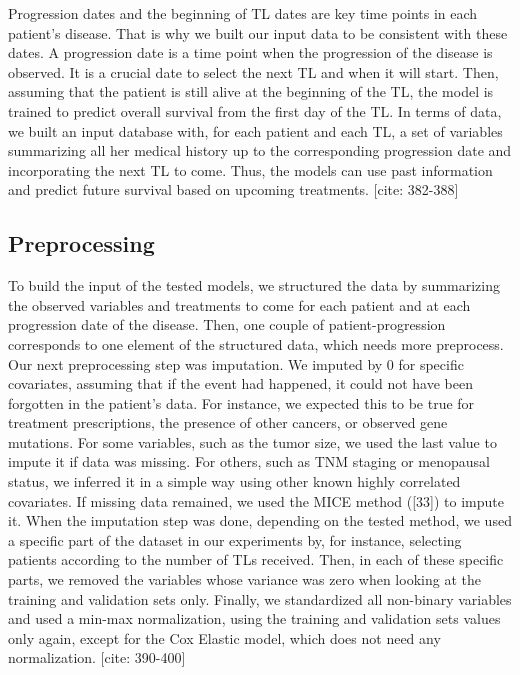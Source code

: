 \documentclass[a4paper,10pt]{article}
\begin{document}
Progression dates and the beginning of TL dates are key time points in each patient's disease. That is why we built our input data to be consistent with these dates. A progression date is a time point when the progression of the disease is observed. It is a crucial date to select the next TL and when it will start. Then, assuming that the patient is still alive at the beginning of the TL, the model is trained to predict overall survival from the first day of the TL. In terms of data, we built an input database with, for each patient and each TL, a set of variables summarizing all her medical history up to the corresponding progression date and incorporating the next TL to come. Thus, the models can use past information and predict future survival based on upcoming treatments. [cite: 382-388]

\subsection{Preprocessing}
To build the input of the tested models, we structured the data by summarizing the observed variables and treatments to come for each patient and at each progression date of the disease. Then, one couple of patient-progression corresponds to one element of the structured data, which needs more preprocess. Our next preprocessing step was imputation. We imputed by 0 for specific covariates, assuming that if the event had happened, it could not have been forgotten in the patient's data. For instance, we expected this to be true for treatment prescriptions, the presence of other cancers, or observed gene mutations. For some variables, such as the tumor size, we used the last value to impute it if data was missing. For others, such as TNM staging or menopausal status, we inferred it in a simple way using other known highly correlated covariates. If missing data remained, we used the MICE method ([33]) to impute it. When the imputation step was done, depending on the tested method, we used a specific part of the dataset in our experiments by, for instance, selecting patients according to the number of TLs received. Then, in each of these specific parts, we removed the variables whose variance was zero when looking at the training and validation sets only. Finally, we standardized all non-binary variables and used a min-max normalization, using the training and validation sets values only again, except for the Cox Elastic model, which does not need any normalization. [cite: 390-400]
\end{document}
